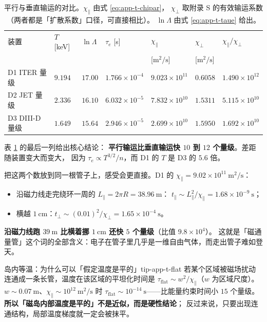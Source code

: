 \begin{table}[htbp]
  \centering
  \caption{平行与垂直输运的对比。$\chi_\parallel$ 由式 \eqref{eq:app-t-chipar}，
    $\chi_\perp$ 取附录 S 的有效输运系数（两者都是「扩散系数」口径，可直接相比）。
    $\ln\Lambda$ 由式 \eqref{eq:app-t-taue} 给出。}
  \label{tab:app-t-transport}
  \begin{tabular}{@{}p{2.6cm}p{1.3cm}p{1.4cm}p{2.3cm}p{2.2cm}p{1.7cm}p{2.2cm}@{}}
    \toprule
    装置 & $T$ [keV] & $\ln\Lambda$ & $\tau_e$ [s] & $\chi_\parallel$ & $\chi_\perp$ & $\chi_\parallel/\chi_\perp$ \\
    & & & & [$\mathrm{m^2/s}$] & [$\mathrm{m^2/s}$] & \\
    \midrule
    D1 ITER 量级 & $9.194$ & $17.00$ & $1.766\times10^{-4}$ & $9.023\times10^{11}$ & $0.6058$ & $1.490\times10^{12}$ \\
    D2 JET 量级 & $2.336$ & $16.10$ & $6.032\times10^{-5}$ & $7.832\times10^{10}$ & $1.5311$ & $5.115\times10^{10}$ \\
    D3 DIII-D 量级 & $1.649$ & $15.64$ & $2.946\times10^{-5}$ & $2.699\times10^{10}$ & $1.5950$ & $1.692\times10^{10}$ \\
    \bottomrule
  \end{tabular}
\end{table}

表 \ref{tab:app-t-transport} 的最后一列给出核心结论：
\textbf{平行输运比垂直输运快 $10$ 到 $12$ 个量级}。差距随装置变大而变大，
因为 $\tau_e\propto T^{3/2}/n$，而 D1 的 $T$ 是 D3 的 $5.6$ 倍。

把这两个数放到同一根管子上，感受会更直接。D1 的 $\chi_\parallel=9.02\times10^{11}\ \mathrm{m^2/s}$：

\begin{itemize}
  \item 沿磁力线走完绕环一周的 $L_\parallel=2\pi R=38.96\ \mathrm{m}$：
        $t_\parallel\sim L_\parallel^2/\chi_\parallel=1.68\times10^{-9}\ \mathrm{s}$；
  \item 横越 $1\ \mathrm{cm}$：$t_\perp\sim(0.01)^2/\chi_\perp=1.65\times10^{-4}\ \mathrm{s}$。
\end{itemize}

\textbf{沿磁力线跑 $39\ \mathrm{m}$ 比横着挪 $1\ \mathrm{cm}$ 还快 $5$ 个量级}（比值 $9.8\times10^{4}$）。
这就是「磁通量管」这个词的全部含义：电子在管子里几乎是一维自由气体，而走出管子难如登天。

\begin{tip}{岛内等温：为什么可以「假定温度是平的」}{tip-app-t-flat}
若某个区域被磁场扰动连通成一条长管，温度在该区域的平坦化时间是
$\tau_{\mathrm{flat}}\sim w^2/\chi_\parallel$（$w$ 为区域尺度）。
$w\sim0.07\ \mathrm{m}$、$\chi_\parallel\sim10^{12}\ \mathrm{m^2/s}$ 时
$\tau_{\mathrm{flat}}\sim10^{-14}\ \mathrm{s}$——比能量约束时间小 $15$ 个量级。
\textbf{所以「磁岛内部温度是平的」不是近似，而是硬性结论}；
反过来说，只要出现连通结构，局部温度梯度就一定会被抹平。
\end{tip}

